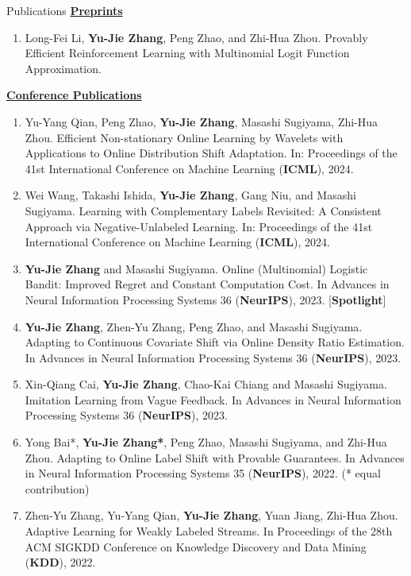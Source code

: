 \documentclass{resume} %
\begin{document}
\begin{rSection}{Publications}
\noindent \underline{\textbf{Preprints}}

\begin{enumerate}[leftmargin= 0.2in]
	\renewcommand*{\labelenumi}{[\theenumi]}
    \item Long-Fei Li, \textbf{Yu-Jie Zhang}, Peng Zhao, and Zhi-Hua Zhou. Provably Efficient Reinforcement Learning with Multinomial Logit Function Approximation. 
\end{enumerate}

\noindent \underline{\textbf{Conference Publications}}
\begin{enumerate}[leftmargin=0.2in]
	\renewcommand*{\labelenumi}{[\theenumi]}
	\setcounter{enumi}{1}
	\item Yu-Yang Qian, Peng Zhao, \textbf{Yu-Jie Zhang}, Masashi Sugiyama, Zhi-Hua Zhou. Efficient Non-stationary Online Learning by Wavelets with Applications to Online Distribution Shift Adaptation. In: Proceedings of the 41st International Conference on Machine Learning (\textbf{ICML}), 2024.
	\item Wei Wang, Takashi Ishida, \textbf{Yu-Jie Zhang}, Gang Niu, and Masashi Sugiyama. Learning with Complementary Labels Revisited: A Consistent Approach via Negative-Unlabeled Learning. In: Proceedings of the 41st International Conference on Machine Learning (\textbf{ICML}), 2024.		 
	\item \textbf{Yu-Jie Zhang} and Masashi Sugiyama. Online (Multinomial) Logistic Bandit: Improved Regret and Constant Computation Cost. In {Advances in Neural Information Processing Systems 36} (\textbf{NeurIPS}), 2023. {\color{darkred}[\textbf{Spotlight}]}
	\item \textbf{Yu-Jie Zhang}, Zhen-Yu Zhang, Peng Zhao, and Masashi Sugiyama. Adapting to Continuous Covariate Shift via Online Density Ratio Estimation. In {Advances in Neural Information Processing Systems 36} (\textbf{NeurIPS}), 2023.
	\item Xin-Qiang Cai, \textbf{Yu-Jie Zhang}, Chao-Kai Chiang and Masashi Sugiyama. Imitation Learning from Vague Feedback. In {Advances in Neural Information Processing Systems 36} (\textbf{NeurIPS}), 2023.
	\item Yong Bai*, \textbf{Yu-Jie Zhang*}, Peng Zhao, Masashi Sugiyama, and Zhi-Hua Zhou. Adapting to Online Label Shift with Provable Guarantees. In {Advances in Neural Information Processing Systems 35} (\textbf{NeurIPS}), 2022.  (* equal contribution)
	\item Zhen-Yu Zhang, Yu-Yang Qian, \textbf{Yu-Jie Zhang}, Yuan Jiang, Zhi-Hua Zhou. Adaptive Learning for Weakly Labeled Streams. In {Proceedings of the 28th ACM SIGKDD Conference on Knowledge Discovery and Data Mining} (\textbf{KDD}), 2022.

\end{enumerate}
\end{rSection}
\end{document}

